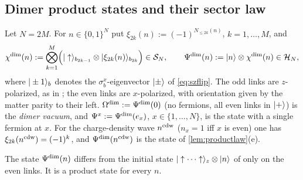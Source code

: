 \subsection{Dimer product states and their sector law}\label{sec:dimer:states}

\begin{definition}\label{def:dimerstate}
Let $N=2M$.  For $n\in\{0,1\}^N$ put $\xi_{2k}(n):=(-1)^{N_{\le2k}(n)}$, $k=1,\dots,M$, and
\begin{equation}\label{eq:dimerstate1}
  \chi^{\mathrm{dim}}(n):=\bigotimes_{k=1}^M\Bigl(|\uparrow\rangle_{b_{2k-1}}\otimes|\xi_{2k}(n)\rangle_{b_{2k}}\Bigr)\in\mathcal{S}_N,
  \qquad \Psi^{\mathrm{dim}}(n):=|n\rangle\otimes\chi^{\mathrm{dim}}(n)\in\mathcal{H}_N,
\end{equation}
where $|\pm1\rangle_{b}$ denotes the $\sigma^x_b$-eigenvector $|\pm\rangle$ of \eqref{eq:szflip}.  The odd
links are $z$-polarized, as in \cite{SKKM2017}; the even links are $x$-polarized, with orientation
given by the matter parity to their left.  $\Omega^{\mathrm{dim}}:=\Psi^{\mathrm{dim}}(0)$ (no fermions, all even links in
$|+\rangle$) is the \emph{dimer vacuum}, and $\Psi^x:=\Psi^{\mathrm{dim}}(e_x)$, $x\in\{1,\dots,N\}$, is the state
with a single fermion at $x$.  For the charge-density wave $n^{\mathrm{cdw}}$ ($n_x=1$ iff $x$ is even) one has
$\xi_{2k}(n^{\mathrm{cdw}})=(-1)^k$, and $\Psi^{\mathrm{dim}}(n^{\mathrm{cdw}})$ is the state of \cref{lem:productlaw}(e).
\end{definition}

The state $\Psi^{\mathrm{dim}}(n)$ differs from the initial state $|\uparrow\cdots\uparrow\rangle_z\otimes|n\rangle$ of
\cite{SKKM2017} only on the even links.  It is a product state for every $n$.

